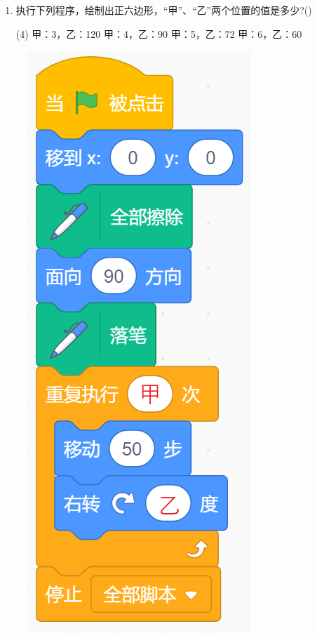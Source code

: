 \documentclass[10pt, a4paper]{article}
\begin{document}
\begin{enumerate}
        \newpage
        \item 执行下列程序，绘制出正六边形，“甲”、“乙”两个位置的值是多少?(\qquad)
        \begin{tasks}(4)
            \task 甲：3，乙：120
            \task 甲：4，乙：90
            \task 甲：5，乙：72
            \task 甲：6，乙：60
        \end{tasks}
    \end{enumerate}

    \begin{figure}[htbp]
        \centering
        \begin{minipage}[t]{.11\textwidth}
            \centering
            \includegraphics[width=\textwidth]{25.png}

\end{minipage}
\end{figure}
\end{document}
